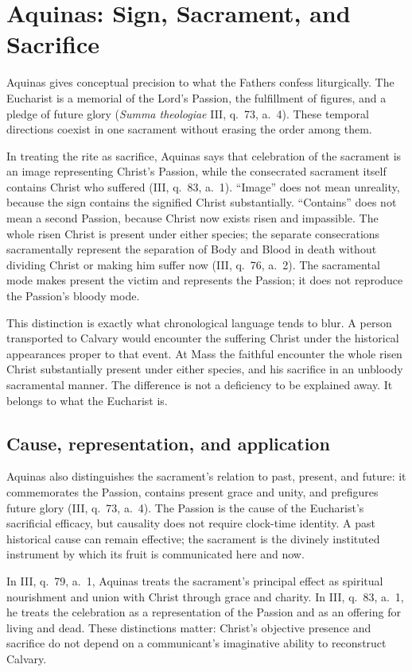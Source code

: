 \section{Aquinas: Sign, Sacrament, and Sacrifice}

Aquinas gives conceptual precision to what the Fathers confess liturgically.
The Eucharist is a memorial of the Lord's Passion, the fulfillment of figures,
and a pledge of future glory (\emph{Summa theologiae} III, q.~73, a.~4).
These temporal directions coexist in one sacrament without erasing the order
among them.

In treating the rite as sacrifice, Aquinas says that celebration of the
sacrament is an image representing Christ's Passion, while the consecrated
sacrament itself contains Christ who suffered (III, q.~83, a.~1). ``Image''
does not mean unreality, because the sign contains the signified Christ
substantially. ``Contains'' does not mean a second Passion, because Christ now
exists risen and impassible. The whole risen Christ is present under either
species; the separate consecrations sacramentally represent the separation of
Body and Blood in death without dividing Christ or making him suffer now (III,
q.~76, a.~2). The
sacramental mode makes present the victim and represents the Passion; it does
not reproduce the Passion's bloody mode.

This distinction is exactly what chronological language tends to blur. A
person transported to Calvary would encounter the suffering Christ under the
historical appearances proper to that event. At Mass the faithful encounter
the whole risen Christ substantially present under either species,
and his sacrifice in an unbloody sacramental manner. The difference is not a
deficiency to be explained away. It belongs to what the Eucharist is.

\subsection*{Cause, representation, and application}

Aquinas also distinguishes the sacrament's relation to past, present, and
future: it commemorates the Passion, contains present grace and unity, and
prefigures future glory (III, q.~73, a.~4). The Passion is the cause of the
Eucharist's sacrificial efficacy, but causality does not require clock-time
identity. A past historical cause can remain effective; the sacrament is the
divinely instituted instrument by which its fruit is communicated here and
now.

In III, q.~79, a.~1, Aquinas treats the sacrament's principal effect as
spiritual nourishment and union with Christ through grace and charity. In III,
q.~83, a.~1, he treats the celebration as a representation of the Passion and
as an offering for living and dead. These distinctions matter: Christ's
objective presence and sacrifice do not depend on a communicant's imaginative
ability to reconstruct Calvary.

